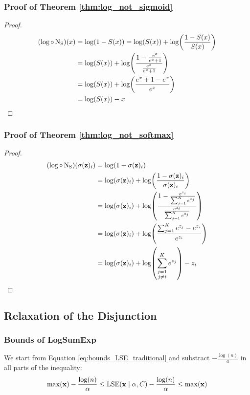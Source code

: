 \subsubsection{Proof of Theorem \ref{thm:log_not_sigmoid}}
\label{appendix:proof_log_not_sigmoid}
\lognotsigmoid*
\begin{proof}
    \begin{align*}
        (\log \circ \operatorname{N_{S}}) (x) &= \log(1-S(x)) = \log(S(x))+\log(\frac{1-S(x)}{S(x)})\\
        & =\log(S(x)) + \log(\frac{1 - \frac{e^x}{e^x+1}}{ \frac{e^x}{e^x+1}}) \\
        & = \log(S(x)) + \log(\frac{e^x + 1 - e^x}{e^x})\\
        & = \log(S(x)) - x \qedhere
    \end{align*}
\end{proof}
    
\subsubsection{Proof of Theorem \ref{thm:log_not_softmax}}
\label{appendix:proof_log_not_softmax}
\lognotsoftmax*
\begin{proof}
    \begin{align*}
        (\log \circ \operatorname{N_{S}}) (\operatorname{\sigma}(\mathbf{z})_i)
         &= \log(1-\operatorname{\sigma}(\mathbf{z})_i) \\
         & = \log(\operatorname{\sigma}(\mathbf{z})_i) + \log(\frac{1-\operatorname{\sigma}(\mathbf{z})_i}{\operatorname{\sigma}(\mathbf{z})_i})\\
         &=  \log(\operatorname{\sigma}(\mathbf{z})_i) + \log(\frac{1 - \frac{e^{z_i}}{\sum_{j=1}^{K} e^{z_j}}}{\frac{e^{z_i}}{\sum_{j=1}^{K} e^{z_j}}})\\
        & =  \log(\operatorname{\sigma}(\mathbf{z})_i) + \log(\frac{\sum_{j=1}^{K} e^{z_j} - e^{z_i}}{e^{z_i}}) \\
        &= \log(\operatorname{\sigma}(\mathbf{z})_i) + \log(\sum_{\substack{j=1\\j\neq i}}^K e^{z_j}) - z_i \qedhere
    \end{align*}
\end{proof}

\subsection{Relaxation of the Disjunction}
\subsubsection{Bounds of LogSumExp}
\label{appendix:bounds_LSE_lower}
We start from Equation \eqref{eq:bounds_LSE_traditional} and substract $-\frac{\log(n)}{a}$ in all parts of the inequality:
\begin{equation}
    \label{eq:appendix_LSE_lb_1}
    \max(\mathbf{x}) - \frac{\log(n)}{\alpha} \leq \operatorname{LSE}(\mathbf{x} \mid \alpha, C) - \frac{\log(n)}{\alpha} \leq \max(\mathbf{x})
\end{equation}

